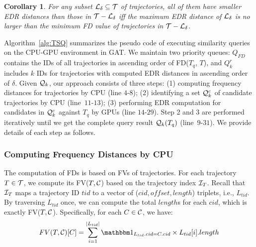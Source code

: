 \documentclass[10pt,conference,letterpaper]{IEEEtran}
\newcommand{\frname}{GAT\xspace }
\newcommand{\simq}{{{\cal Q}_k}\xspace}
\newcommand{\simcand}{{{\cal Q}_k^c}\xspace}
\newcommand{\alltraj}{{{\cal T}}\xspace}
\newcommand{\edr}{{\delta}\xspace}
\newcommand{\allcell}{{\cal C}\xspace}
\newcommand{\trajindex}{{{\cal I}_T}\xspace}
\newcommand{\knownedr}{{{\cal L}_\edr}\xspace}
\newtheorem{corollary}{Corollary}
\begin{document}
\begin{corollary}\label{cor:lb}
	For any subset $\knownedr\subseteq \alltraj$ of trajectories, all of them have smaller EDR distances than those in $\alltraj-\knownedr$ iff the maximum EDR distance of $\knownedr$ is no larger than the minimum FD value of trajectories in $\alltraj-\knownedr$.
\end{corollary}






Algorithm~\ref{alg:TSQ} summarizes the pseudo code of executing similarity queries on the CPU-GPU environment in \frname.
We maintain two priority queues: ${Q}_{FD}$ contains the IDs of all trajectories in ascending order of FD($T_q$, $T$), and ${Q}_{k}^r$ includes $k$ IDs for trajectories with computed EDR distances in ascending order of $\edr$.
Given $\simq$, our approach consists of three steps: (1) computing frequency distances for trajectories by CPU (line $4$-$8$); (2) identifying a set $\simcand$ of candidate trajectories by CPU (line~$11$-$13$); (3) performing EDR computation for candidates in $\simcand$ against $T_q$ by GPUs (line $14$-$29$). Step 2 and 3 are performed iteratively until we get the complete query result $\simq(T_q)$ (line~$9$-$31$).
We provide details of each step as follows.


\subsubsection{Computing Frequency Distances by CPU}
The computation of FDs is based on FVs of trajectories. For each trajectory $T\in\alltraj$, we compute its FV($T,\allcell$) based on the trajectory index $\trajindex$. Recall that $\trajindex$ maps a trajectory ID $tid$ to a vector of ($cid, offset, length$) triplets, i.e., $L_{tid}$. By traversing $L_{tid}$ once, we can compute the total $length$s for each $cid$, which is exactly FV($T,\allcell$). Specifically, for each $C\in\allcell$, we have:
\begin{equation}
\small
FV(T,\allcell)[C] = \sum_{i=1}^{|L_{tid}|} {{\mathbbm 1}_{L_{tid}.cid = C.cid} \times L_{tid}[i].length }
\end{equation}
\end{document}
